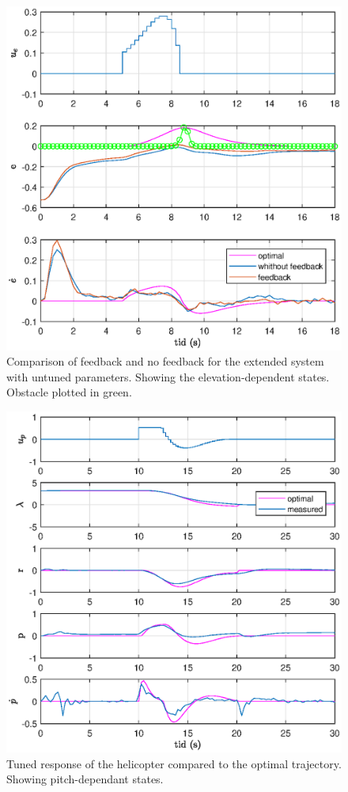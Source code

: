 \begin{figure}[h]
	\centering
	\includegraphics[width=\textwidth]{figures/plots/4_fb_vs_no_fb_UNTUNED_elev.eps}
	\caption{Comparison of feedback and no feedback for the extended system with untuned parameters. Showing the elevation-dependent states. Obstacle plotted in green.}
\label{fig:4_untuned_elev}
\end{figure}

\begin{figure}[h]
	\centering
	\includegraphics[width=\textwidth]{figures/plots/4_tuned_legend_pitch.eps}
	\caption{Tuned response of the helicopter compared to the optimal trajectory. Showing pitch-dependant states.}
\label{fig:4_tuned_pitch}
\end{figure}

